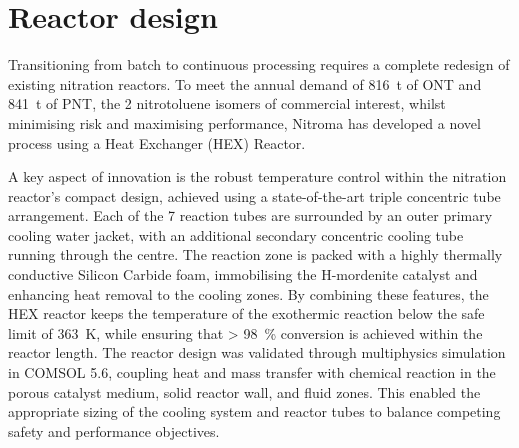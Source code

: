 \section*{Reactor design}
Transitioning from batch to continuous processing requires a complete redesign of existing nitration reactors. To meet the annual demand of \SI{816}{\tonne} of ONT and \SI{841}{\tonne} of PNT, the 2 nitrotoluene isomers of commercial interest, whilst minimising risk and maximising performance, Nitroma has developed a novel process using a Heat Exchanger (HEX) Reactor.

A key aspect of innovation is the robust temperature control within the nitration reactor's compact design, achieved using a state-of-the-art triple concentric tube arrangement. Each of the 7 reaction tubes are surrounded by an outer primary cooling water jacket, with an additional secondary concentric cooling tube running through the centre. The reaction zone is packed with a highly thermally conductive Silicon Carbide foam, immobilising the H-mordenite catalyst and enhancing heat removal to the cooling zones. By combining these features, the HEX reactor keeps the temperature of the exothermic reaction below the safe limit of \SI{363}{\K}, while ensuring that \SI{> 98}{\percent} conversion is achieved within the reactor length. The reactor design was validated through multiphysics simulation in COMSOL 5.6, coupling heat and mass transfer with chemical reaction in the porous catalyst medium, solid reactor wall, and fluid zones. This enabled the appropriate sizing of the cooling system and reactor tubes to balance competing safety and performance objectives.

